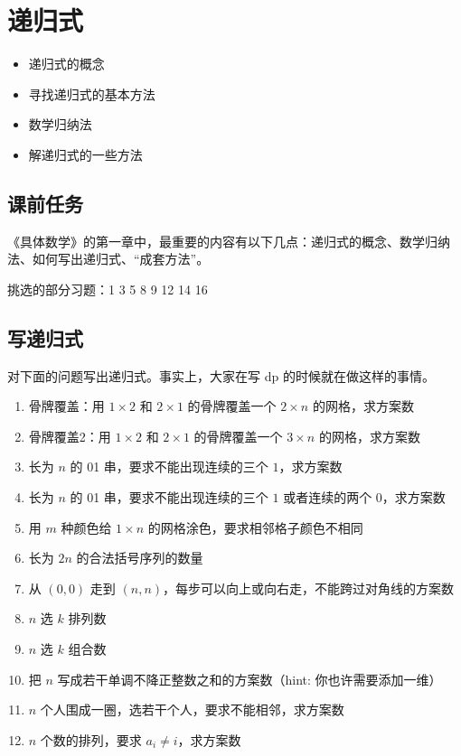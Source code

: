 \chapter{递归式}

\begin{overview}
\begin{itemize}
    \item 递归式的概念
    \item 寻找递归式的基本方法
    \item 数学归纳法
    \item 解递归式的一些方法
\end{itemize}
\end{overview}

\section{课前任务}

《具体数学》的第一章中，最重要的内容有以下几点：递归式的概念、数学归纳法、如何写出递归式、“成套方法”。

挑选的部分习题：1 3 5 8 9 12 14 16

\section{写递归式}

\begin{exercise}
    对下面的问题写出递归式。事实上，大家在写 dp 的时候就在做这样的事情。
    \begin{enumerate}
        \item 骨牌覆盖：用 $1\times 2$ 和 $2\times 1$ 的骨牌覆盖一个 $2\times n$ 的网格，求方案数
        \item 骨牌覆盖2：用 $1\times 2$ 和 $2\times 1$ 的骨牌覆盖一个 $3\times n$ 的网格，求方案数
        \item 长为 $n$ 的 01 串，要求不能出现连续的三个 $1$，求方案数
        \item 长为 $n$ 的 01 串，要求不能出现连续的三个 $1$ 或者连续的两个 $0$，求方案数
        \item 用 $m$ 种颜色给 $1\times n$ 的网格涂色，要求相邻格子颜色不相同
        \item 长为 $2n$ 的合法括号序列的数量
        \item 从 $(0,0)$ 走到 $(n,n)$，每步可以向上或向右走，不能跨过对角线的方案数
        \item $n$ 选 $k$ 排列数
        \item $n$ 选 $k$ 组合数
        \item 把 $n$ 写成若干单调不降正整数之和的方案数（hint: 你也许需要添加一维）
        \item $n$ 个人围成一圈，选若干个人，要求不能相邻，求方案数
        \item $n$ 个数的排列，要求 $a_i\ne i$，求方案数
    \end{enumerate}
\end{exercise}

